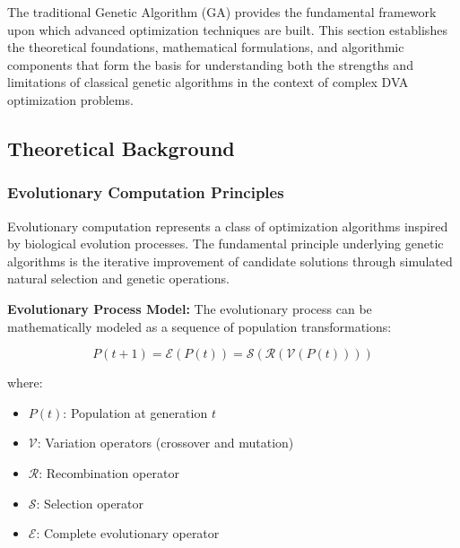 \documentclass[12pt,a4paper]{article}
\begin{document}
The traditional Genetic Algorithm (GA) provides the fundamental framework upon which advanced optimization techniques are built. This section establishes the theoretical foundations, mathematical formulations, and algorithmic components that form the basis for understanding both the strengths and limitations of classical genetic algorithms in the context of complex DVA optimization problems.

\subsection{Theoretical Background}

\subsubsection{Evolutionary Computation Principles}

Evolutionary computation represents a class of optimization algorithms inspired by biological evolution processes. The fundamental principle underlying genetic algorithms is the iterative improvement of candidate solutions through simulated natural selection and genetic operations.

\textbf{Evolutionary Process Model:} The evolutionary process can be mathematically modeled as a sequence of population transformations:

\begin{equation}\label{Eq.evolutionary_process_refined}
P(t+1) = \mathcal{E}(P(t)) = \mathcal{S}\left( \mathcal{R}\left( \mathcal{V}(P(t)) \right) \right)
\end{equation}

where:
\begin{itemize}
    \item $P(t)$: Population at generation $t$
    \item $\mathcal{V}$: Variation operators (crossover and mutation)
    \item $\mathcal{R}$: Recombination operator
    \item $\mathcal{S}$: Selection operator
    \item $\mathcal{E}$: Complete evolutionary operator
\end{itemize}
\end{document}
